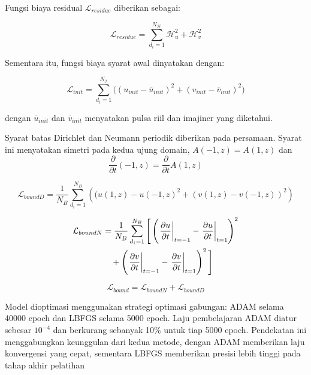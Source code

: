 \noindent
Fungsi biaya residual $\mathcal{L}_{residue}$ diberikan sebagai: 

\begin{equation}
    \mathcal{L}_{residue} =  \sum_{d_i = 1}^{N_{\mathcal{H}}} \mathcal{H}_u^2+\mathcal{H}_v^2
\end{equation}

\noindent
Sementara itu, fungsi biaya syarat awal dinyatakan dengan: 

\begin{equation}
    \mathcal{L}_{init} =  \sum_{d_i = 1}^{N_{\mathcal{I}}} \bigg( (u_{init}-\bar{u}_{init})^2 + (v_{init}-\bar{v}_{init})^2 \bigg)
\end{equation}

\noindent 
dengan \(\bar{u}_{init}\) dan \(\bar{v}_{init}\) menyatakan pulsa riil dan imajiner yang diketahui.

\noindent
Syarat batas Dirichlet dan Neumann periodik diberikan pada persamaan. Syarat ini menyatakan simetri pada kedua ujung domain, $A(-1,z) = A(1,z)$ dan $$\frac{\partial}{\partial t}(-1,z) = \frac{\partial}{\partial t}A(1,z)$$

\begin{equation}
    \mathcal{L}_{boundD} =  \frac{1}{N_B}\sum_{d_i = 1}^{N_B} \left((u(1,z)-u(-1,z)^2 + (v(1,z)-v(-1,z))^2 \right)
\end{equation}

\begin{align}
\mathcal{L}_{boundN} 
&= \frac{1}{N_B} \sum_{d_i = 1}^{N_B} \Bigg[
    \left( \left.\frac{\partial u}{\partial t} \right|_{t = -1} - 
           \left.\frac{\partial u}{\partial t} \right|_{t = 1} \right)^2 
    \notag \\ &\quad
    + \left( \left.\frac{\partial v}{\partial t} \right|_{t =-1} - 
             \left.\frac{\partial v}{\partial t} \right|_{t = 1} \right)^2
\Bigg]
\end{align}

\begin{equation}
     \mathcal{L}_{bound} = \mathcal{L}_{boundN} + \mathcal{L}_{boundD}
\end{equation}

Model dioptimasi menggunakan strategi optimasi gabungan: ADAM selama 40000 epoch dan LBFGS selama 5000 epoch. Laju pembelajaran ADAM diatur sebesar \(10^{-4}\) dan berkurang sebanyak 10\% untuk tiap 5000 epoch. Pendekatan ini menggabungkan keunggulan dari kedua metode, dengan ADAM memberikan laju konvergensi yang cepat, sementara LBFGS memberikan presisi lebih tinggi pada tahap akhir pelatihan

